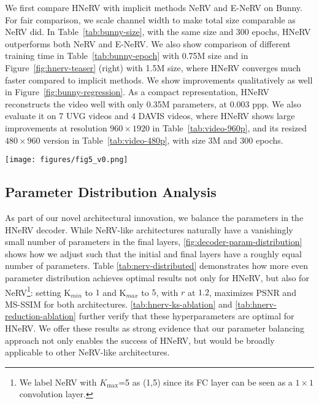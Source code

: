 \documentclass[10pt,twocolumn,letterpaper]{article}
\begin{document}
We first compare HNeRV with implicit methods NeRV and E-NeRV on Bunny.
For fair comparison, we scale channel width to make total size comparable as NeRV did.
In Table~\ref{tab:bunny-size}, with the same size and 300 epochs, HNeRV outperforms both NeRV and E-NeRV.
We also show comparison of different training time in Table~\ref{tab:bunny-epoch} with 0.75M size and in Figure~\ref{fig:hnerv-teaser} (right) with 1.5M size, where HNeRV converges much faster compared to implicit methods.
We show improvements qualitatively as well in Figure~\ref{fig:bunny-regression}.
As a compact representation, HNeRV reconstructs the video well with only 0.35M parameters, at 0.003 ppp.
We also evaluate it on 7 UVG videos and 4 DAVIS videos, where HNeRV shows large improvements at resolution  \textbf{$960\times1920$} in Table~\ref{tab:video-960p}, and its resized \textbf{$480\times960$} version in Table~\ref{tab:video-480p}, with size 3M and 300 epochs.

\begin{figure*}[t!]
    \centering
    \texttt{[image: figures/fig5\_v0.png]}
    \vspace{-1em}
    \caption{
    \textbf{Visualization of video neural representations} at 0.003 ppp, which means the total size is only about 0.3\% of the original video size. 
    On the \textbf{left}, we compare HNeRV to ground truth. On the \textbf{right}, we compare NeRV, E-NeRV, and HNeRV for 5 patches.
    }
    \label{fig:bunny-regression}
    \vspace{-1em}
\end{figure*}



\subsection{Parameter Distribution Analysis}
\label{subsec:component-analysis}

As part of our novel architectural innovation, we balance the parameters in the HNeRV decoder.
While NeRV-like architectures naturally have a vanishingly small number of parameters in the final layers, \cref{fig:decoder-param-distribution} shows how we adjust such that the initial and final layers have a roughly equal number of parameters.
Table \ref{tab:nerv-distributed} demonstrates how more even parameter distribution achieves optimal results not only for HNeRV, but also for NeRV\footnote{We label NeRV with $K_\text{max}$=5 as (1,5) since its FC layer can be seen as a $1 \times 1$ convolution layer.}: setting K$_{min}$ to $1$ and K$_{max}$ to $5$, with $r$ at $1.2$, maximizes PSNR and MS-SSIM for both architectures.
\cref{tab:hnerv-ks-ablation} and \cref{tab:hnerv-reduction-ablation} further verify that these hyperparameters are optimal for HNeRV.
We offer these results as strong evidence that our parameter balancing approach not only enables the success of HNeRV, but would be broadly applicable to other NeRV-like architectures.
\end{document}
